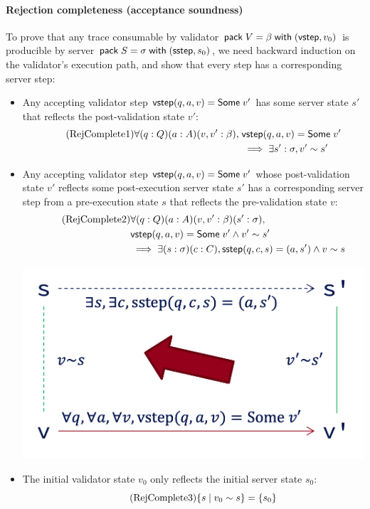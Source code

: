 \paragraph{Rejection completeness (acceptance soundness)}
To prove that any trace consumable by validator
$\mathsf{pack}\;V=\beta\;\mathsf{with}\;(\mathsf{vstep},v_0)$ is producible by server
$\mathsf{pack}\;S=\sigma\;\mathsf{with}\;(\mathsf{sstep},s_0)$, we need backward induction on the
validator's execution path, and show that every step has a corresponding server
step:
\begin{itemize}
\item Any accepting validator step $\mathsf{vstep}(q,a,v)=\mathsf{Some}\;v'$ has some server
  state $s'$ that reflects the post-validation state $v'$:
  \begin{align*}
    \tag{RejComplete1}
    \label{eq:rc1}
    \forall(q:Q)(a:A)(v, v':\beta),\;&\mathsf{vstep}(q,a,v)=\mathsf{Some}\;v'\\
    &\implies\exists s':\sigma,v'\sim s' 
  \end{align*}
\item Any accepting validator step $\mathsf{vstep}(q,a,v)=\mathsf{Some}\;v'$ whose
  post-validation state $v'$ reflects some post-execution server state $s'$
  has a corresponding server step from a pre-execution state $s$
  that reflects the pre-validation state $v$:
  \begin{align*}
    \tag{RejComplete2}
    \label{eq:rc2}
    &\forall(q:Q)(a:A)(v,v':\beta)(s':\sigma),\\
    &\mathsf{vstep}(q,a,v)=\mathsf{Some}\;v'\wedge v'\sim s'\\
    &\implies\exists(s:\sigma)(c:C),\mathsf{sstep}(q,c,s)=(a,s')\wedge v\sim s
  \end{align*}
  \begin{center}
    \includegraphics[width=.5\textwidth]{figures/complete}
  \end{center}

\item The initial validator state $v_0$ only reflects the initial server state $s_0$:
  \begin{equation}
    \tag{RejComplete3}
    \label{eq:rc3}
    \{s\mid v_0\sim s\}=\{s_0\}
  \end{equation}
\end{itemize}

